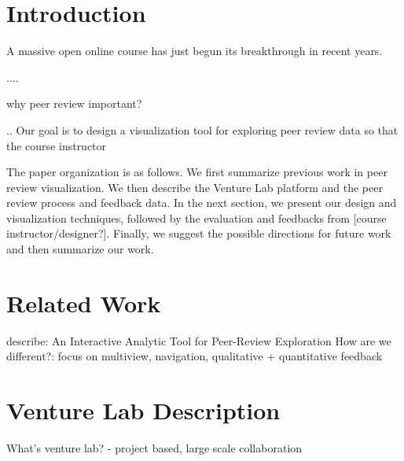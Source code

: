 \documentclass{sigchi}
\begin{document}


\section{Introduction}
A massive open online course has just begun its breakthrough in recent years.

....

why peer review important?

..
Our goal is to design a visualization tool for exploring peer review data so that the course instructor 

The paper organization is as follows. We first summarize previous work in peer review visualization. We then describe the Venture Lab platform and the peer review process and feedback data. In the next section, we present our design and visualization techniques, followed by the evaluation and feedbacks from [course instructor/designer?]. Finally, we suggest the possible directions for future work and then summarize our work.

\section{Related Work}
describe: An Interactive Analytic Tool for Peer-Review Exploration
How are we different?: focus on multiview, navigation, qualitative + quantitative feedback

\section{Venture Lab Description}
What's venture lab? - project based, large scale collaboration
\end{document}
